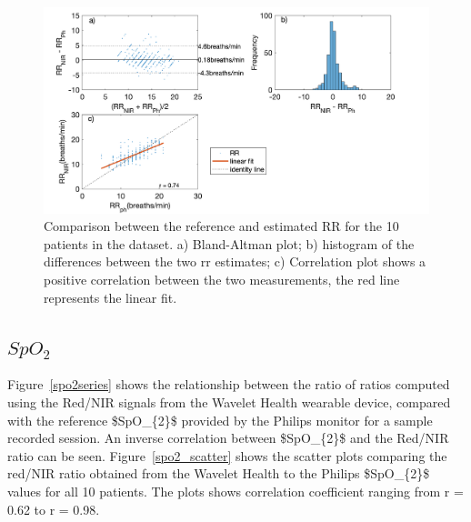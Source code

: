 \begin{figure}
    \centering
	\includegraphics[width = 11 cm]{./figures/RR_summary_plot_method_ALL1.png}
	 \caption[Comparison between the reference and estimated RR for the 10 patients in the dataset.]{Comparison between the reference and estimated RR for the 10 patients in the dataset. a) Bland-Altman plot; b) histogram of the differences between the two \gls{rr} estimates; c) Correlation plot shows a positive correlation between the two measurements, the red line represents the linear fit.}
	 \label{RRsummary3} 
\end{figure}

\subsection{$SpO_2$}


Figure~\ref{spo2series} shows the relationship between the ratio of ratios computed using the Red/NIR signals from the Wavelet Health wearable device, compared with the reference  \gls{$SpO_{2}$} provided by the Philips monitor for a sample recorded session. An inverse correlation between \gls{$SpO_{2}$} and the Red/NIR ratio can be seen.
Figure~\ref{spo2_scatter} shows the scatter plots comparing the red/NIR ratio obtained from the Wavelet Health to the Philips \gls{$SpO_{2}$}  values for all 10 patients. The plots shows correlation coefficient  ranging from r = 0.62 to r = 0.98.


